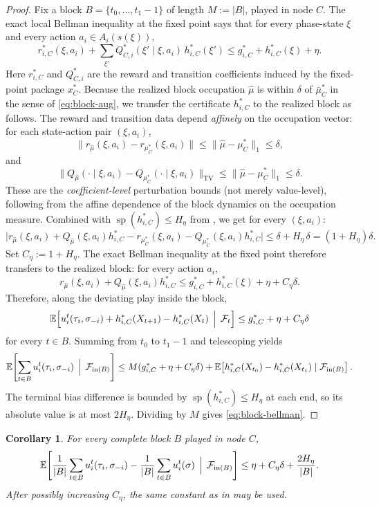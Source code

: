 \documentclass[12pt]{article}
\newtheorem{corollary}[theorem]{Corollary}
\theoremstyle{definition}
\newcommand{\E}{\mathbb{E}}
\newcommand{\1}{\mathbf{1}}
\DeclareMathOperator{\spn}{sp}
\begin{document}
\begin{proof}
Fix a block \(B=\{t_0,\dots,t_1-1\}\) of length \(M:=|B|\), played in node \(C\).  The
exact local Bellman inequality at the fixed point says that for every phase-state
\(\xi\) and every action \(a_i\in A_i(s(\xi))\),
\[
r_{i,C}^*(\xi,a_i)+\sum_{\xi'}Q_{C,i}^*(\xi' \mid \xi,a_i)\,h_{i,C}^*(\xi')
\le
g_{i,C}^*+h_{i,C}^*(\xi)+\eta.
\]
Here \(r_{i,C}^*\) and \(Q_{C,i}^*\) are the reward and transition coefficients induced by
the fixed-point package \(x_C^*\).  Because the realized block occupation \(\widehat\mu\) is within
\(\delta\) of \(\bar\mu_C^*\) in the sense of \eqref{eq:block-aug}, we transfer the certificate \(h_{i,C}^*\) to the realized block as follows. The reward and transition data depend \emph{affinely} on the occupation vector: for each state-action pair \((\xi,a_i)\),
\[
\|r_{\widehat\mu}(\xi,a_i)-r_{\mu_C^*}(\xi,a_i)\|\le \|\widehat\mu-\mu_C^*\|_1\le\delta,
\]
and
\[
\|Q_{\widehat\mu}(\cdot\mid\xi,a_i)-Q_{\mu_C^*}(\cdot\mid\xi,a_i)\|_{\mathrm{TV}}\le \|\widehat\mu-\mu_C^*\|_1\le\delta.
\]
These are the \emph{coefficient-level} perturbation bounds (not merely value-level), following from the affine dependence of the block dynamics on the occupation measure. Combined with \(\operatorname{sp}(h_{i,C}^*)\le H_\eta\) from , we get for every \((\xi,a_i)\):
\[
\bigl|r_{\widehat\mu}(\xi,a_i)+Q_{\widehat\mu}(\xi,a_i)h_{i,C}^* - r_{\mu_C^*}(\xi,a_i)-Q_{\mu_C^*}(\xi,a_i)h_{i,C}^*\bigr|
\le \delta+H_\eta\,\delta = (1+H_\eta)\delta.
\]
Set \(C_\eta:=1+H_\eta\). The exact Bellman inequality at the fixed point therefore transfers to the realized block: for every action \(a_i\),
\[
r_{\widehat\mu}(\xi,a_i)+Q_{\widehat\mu}(\xi,a_i)h_{i,C}^*
\le g_{i,C}^*+h_{i,C}^*(\xi)+\eta+C_\eta\delta.
\]
Therefore, along the deviating play inside the block,
\[
\E\!\left[
u_i^t(\tau_i,\sigma_{-i})
+h_{i,C}^*(X_{t+1})-h_{i,C}^*(X_t)
\,\Bigm|\, \mathcal F_t
\right]
\le
g_{i,C}^*+\eta+C_\eta\delta
\]
for every \(t\in B\).  Summing from \(t_0\) to \(t_1-1\) and telescoping yields
\[
\E\!\left[
\sum_{t\in B}u_i^t(\tau_i,\sigma_{-i})
\,\Bigm|\, \mathcal F_{\mathrm{in}(B)}
\right]
\le
M(g_{i,C}^*+\eta+C_\eta\delta)
+
\E\!\left[h_{i,C}^*(X_{t_0})-h_{i,C}^*(X_{t_1})\mid \mathcal F_{\mathrm{in}(B)}\right].
\]
The terminal bias difference is bounded by \(\spn(h_{i,C}^*)\le H_\eta\) at each end, so
its absolute value is at most \(2H_\eta\).  Dividing by \(M\) gives
\eqref{eq:block-bellman}.
\end{proof}

\begin{corollary}
\label{cor:block-regret}
For every complete block \(B\) played in node \(C\),
\[
\E\!\left[
\frac1{|B|}\sum_{t\in B} u_i^t(\tau_i,\sigma_{-i})
-
\frac1{|B|}\sum_{t\in B} u_i^t(\sigma)
\,\Bigm|\, \mathcal F_{\mathrm{in}(B)}
\right]
\le
\eta + C_\eta\delta + \frac{2H_\eta}{|B|}.
\]
After possibly increasing \(C_\eta\), the same constant as in 
may be used.
\end{corollary}
\end{document}
